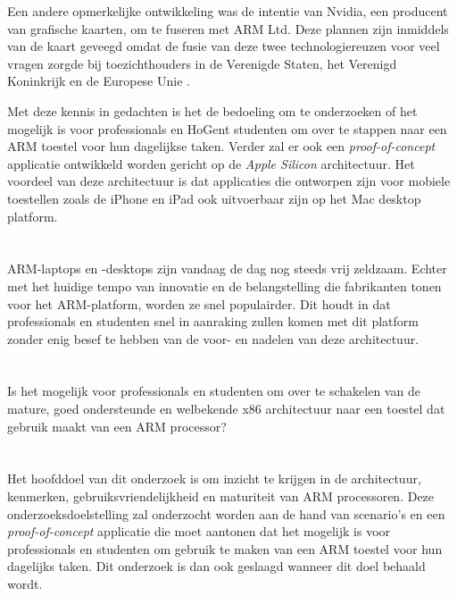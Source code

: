 Een andere opmerkelijke ontwikkeling was de intentie van Nvidia, een producent van grafische kaarten, om te fuseren met ARM Ltd. Deze plannen zijn inmiddels van de kaart geveegd omdat de fusie van deze twee technologiereuzen voor veel vragen zorgde bij toezichthouders in de Verenigde Staten, het Verenigd Koninkrijk en de Europese Unie \autocite{Dowd2022}. 

Met deze kennis in gedachten is het de bedoeling om te onderzoeken of het mogelijk is voor professionals en HoGent studenten om over te stappen naar een ARM toestel voor hun dagelijkse taken. Verder zal er ook een \textit{proof-of-concept} applicatie ontwikkeld worden gericht op de \textit{Apple Silicon} architectuur. Het voordeel van deze architectuur is dat applicaties die ontworpen zijn voor mobiele toestellen zoals de iPhone en iPad ook uitvoerbaar zijn op het Mac desktop platform.

\section{}
\label{sec:probleemstelling}

ARM-laptops en -desktops zijn vandaag de dag nog steeds vrij zeldzaam. Echter met het huidige tempo van innovatie en de belangstelling die fabrikanten tonen voor het ARM-platform, worden ze snel populairder. Dit houdt in dat professionals en studenten snel in aanraking zullen komen met dit platform zonder enig besef te hebben van de voor- en nadelen van deze architectuur. 

\section{}
\label{sec:onderzoeksvraag}

Is het mogelijk voor professionals en studenten om over te schakelen van de mature, goed ondersteunde en welbekende x86 architectuur naar een toestel dat gebruik maakt van een ARM processor? 

\section{}
\label{sec:onderzoeksdoelstelling}

Het hoofddoel van dit onderzoek is om inzicht te krijgen in de architectuur, kenmerken, gebruiksvriendelijkheid en maturiteit van ARM processoren. Deze onderzoeksdoelstelling zal onderzocht worden aan de hand van scenario’s en een \textit{proof-of-concept} applicatie die moet aantonen dat het mogelijk is voor professionals en studenten om gebruik te maken van een ARM toestel voor hun dagelijks taken. Dit onderzoek is dan ook geslaagd wanneer dit doel behaald wordt.

